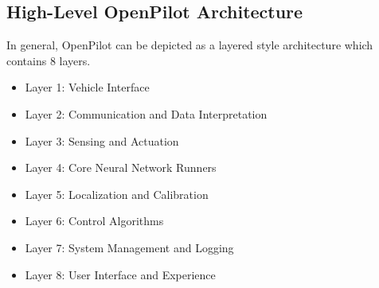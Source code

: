 \documentclass[12pt]{article}
\begin{document}
\subsection{High-Level OpenPilot Architecture}
    In general, OpenPilot can be depicted as a layered style architecture which contains 8 layers.
    \begin{itemize}
        \item[] Layer 1: Vehicle Interface 
        \item[] Layer 2: Communication and Data Interpretation
        \item[] Layer 3: Sensing and Actuation
        \item[] Layer 4: Core Neural Network Runners
        \item[] Layer 5: Localization and Calibration 
        \item[] Layer 6: Control Algorithms
        \item[] Layer 7: System Management and Logging
        \item[] Layer 8: User Interface and Experience 
    \end{itemize} 
\end{document}
